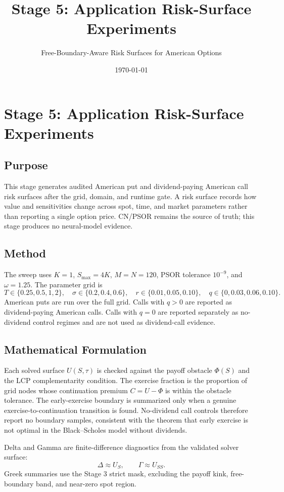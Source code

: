 \documentclass[11pt]{article}
\title{Stage 5: Application Risk-Surface Experiments}
\author{Free-Boundary-Aware Risk Surfaces for American Options}
\date{\today}
\begin{document}
\maketitle

\section{Stage 5: Application Risk-Surface Experiments}

\subsection{Purpose}
This stage generates audited American put and dividend-paying American call
risk surfaces after the grid, domain, and runtime gate. A risk surface records
how value and sensitivities change across spot, time, and market parameters
rather than reporting a single option price. CN/PSOR remains the source of
truth; this stage produces no neural-model evidence.

\subsection{Method}
The sweep uses $K=1$, $S_{\max}=4K$, $M=N=120$, PSOR tolerance $10^{-9}$, and $\omega=1.25$. The parameter grid is
\[
T\in\{0.25,0.5,1,2\},\quad
\sigma\in\{0.2,0.4,0.6\},\quad
r\in\{0.01,0.05,0.10\},\quad
q\in\{0,0.03,0.06,0.10\}.
\]
American puts are run over the full grid. Calls with $q>0$ are reported as dividend-paying American calls. Calls with $q=0$ are reported separately as no-dividend control regimes and are not used as dividend-call evidence.

\subsection{Mathematical Formulation}
Each solved surface \(U(S,\tau)\) is checked against the payoff obstacle
\(\Phi(S)\) and the LCP complementarity condition. The exercise fraction is
the proportion of grid nodes whose continuation premium
\(C=U-\Phi\) is within the obstacle tolerance. The early-exercise boundary is
summarized only when a genuine exercise-to-continuation transition is found.
No-dividend call controls therefore report no boundary samples, consistent with
the theorem that early exercise is not optimal in the Black--Scholes model
without dividends.

Delta and Gamma are finite-difference diagnostics from the validated solver surface:
\[
\Delta \approx U_S,\qquad \Gamma \approx U_{SS}.
\]
Greek summaries use the Stage 3 strict mask, excluding the payoff kink, free-boundary band, and near-zero spot region.
\end{document}
